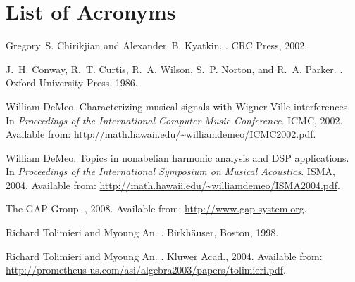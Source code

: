 \documentclass{article}
\begin{document}
\vskip5mm



\section*{List of Acronyms}
\begin{acronym}
\end{acronym}



\def\cprime{$'$} \def\cprime{$'$}
  \def\ocirc#1{\ifmmode\setbox0=\hbox{$#1$}\dimen0=\ht0 \advance\dimen0
  by1pt\rlap{\hbox to\wd0{\hss\raise\dimen0
  \hbox{\hskip.2em$\scriptscriptstyle\circ$}\hss}}#1\else {\accent"17 #1}\fi}
\begin{thebibliography}{1}

Gregory~S. Chirikjian and Alexander~B. Kyatkin.
.
\newblock CRC Press, 2002.

J.~H. Conway, R.~T. Curtis, R.~A. Wilson, S.~P. Norton, and R.~A. Parker.
.
\newblock Oxford University Press, 1986.

William DeMeo.
\newblock Characterizing musical signals with {W}igner-{V}ille interferences.
\newblock In {\em Proceedings of the International Computer Music Conference}.
  ICMC, 2002.
\newblock Available from:
  \url{http://math.hawaii.edu/~williamdemeo/ICMC2002.pdf}.

William DeMeo.
\newblock Topics in nonabelian harmonic analysis and {DSP} applications.
\newblock In {\em Proceedings of the International Symposium on Musical
  Acoustics}. ISMA, 2004.
\newblock Available from:
  \url{http://math.hawaii.edu/~williamdemeo/ISMA2004.pdf}.

The GAP Group.
,
  2008.
\newblock Available from: \url{http://www.gap-system.org}.

Richard Tolimieri and Myoung An.
.
\newblock Birkh\"{a}user, Boston, 1998.

Richard Tolimieri and Myoung An.
.
\newblock Kluwer Acad., 2004.
\newblock Available from:
  \url{http://prometheus-us.com/asi/algebra2003/papers/tolimieri.pdf}.

\end{thebibliography}
\end{document}
